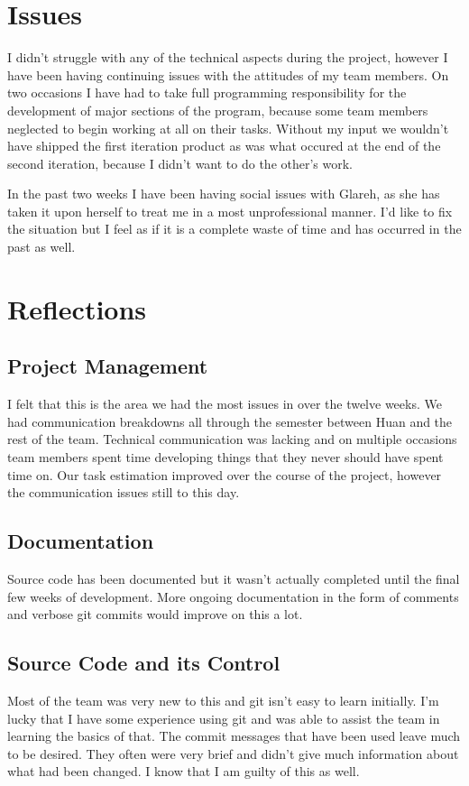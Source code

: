 \documentclass{article}
\begin{document}
\section{Issues}
I didn't struggle with any of the technical aspects during the project, however I have been having continuing issues with the attitudes of my team members. On two occasions I have had to take full programming responsibility for the development of major sections of the program, because some team members neglected to begin working at all on their tasks. Without my input we wouldn't have shipped the first iteration product as was what occured at the end of the second iteration, because I didn't want to do the other's work. 

In the past two weeks I have been having social issues with Glareh, as she has taken it upon herself to treat me in a most unprofessional manner. I'd like to fix the situation but I feel as if it is a complete waste of time and has occurred in the past as well.

\section{Reflections}
\subsection{Project Management}
I felt that this is the area we had the most issues in over the twelve weeks. We had communication breakdowns all through the semester between Huan and the rest of the team. Technical communication was lacking and on multiple occasions team members spent time developing things that they never should have spent time on. Our task estimation improved over the course of the project, however the communication issues still to this day.

\subsection{Documentation}
Source code has been documented but it wasn't actually completed until the final few weeks of development. More ongoing documentation in the form of comments and verbose git commits would improve on this a lot.

\subsection{Source Code and its Control}
Most of the team was very new to this and git isn't easy to learn initially. I'm lucky that I have some experience using git and was able to assist the team in learning the basics of that. The commit messages that have been used leave much to be desired. They often were very brief and didn't give much information about what had been changed. I know that I am guilty of this as well.
\end{document}
